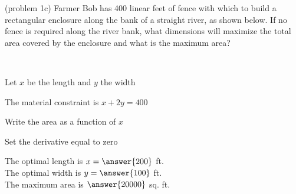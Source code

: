 \documentclass{ximera}
\begin{document}
\begin{problem}(problem 1c)
Farmer Bob has 400 linear feet of fence with which to build a 
rectangular enclosure along the bank of a straight river, as shown below.  
If no fence is required along the river bank, what dimensions will maximize the total area 
covered by the enclosure and what is the maximum area?
\begin{center}
\\
\end{center}
\begin{hint}
Let $x$ be the length and $y$ the width
\end{hint}
\begin{hint}
The material constraint is $x+2y = 400$
\end{hint}
\begin{hint}
Write the area as a function of $x$
\end{hint}
\begin{hint}
Set the derivative equal to zero
\end{hint}

The optimal length is $x= \answer{200}$ ft.\\
The optimal width is $y = \answer{100}$ ft.\\
The maximum area is $\answer{20000}$ sq. ft.


\end{problem}
\end{document}
